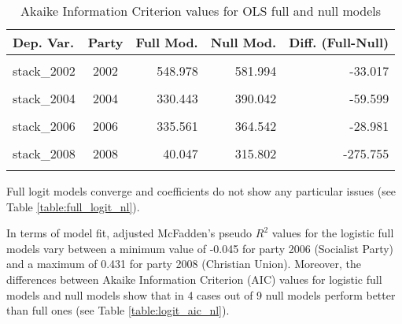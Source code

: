 \documentclass[
]{article}
\begin{document}
\begin{table}[!h]

\caption{\label{tab:unnamed-chunk-131}Akaike Information Criterion values for OLS full and null models 
        \label{table:ols_aic_nl}}
\centering
\begin{tabular}[t]{lcrrr}
\toprule
Dep. Var. & Party & Full Mod. & Null Mod. & Diff. (Full-Null)\\
\midrule
\cellcolor{gray!6}{stack\_2001} & \cellcolor{gray!6}{2001} & \cellcolor{gray!6}{454.279} & \cellcolor{gray!6}{531.738} & \cellcolor{gray!6}{-77.459}\\
stack\_2002 & 2002 & 548.978 & 581.994 & -33.017\\
\cellcolor{gray!6}{stack\_2003} & \cellcolor{gray!6}{2003} & \cellcolor{gray!6}{217.757} & \cellcolor{gray!6}{350.169} & \cellcolor{gray!6}{-132.411}\\
stack\_2004 & 2004 & 330.443 & 390.042 & -59.599\\
\cellcolor{gray!6}{stack\_2005} & \cellcolor{gray!6}{2005} & \cellcolor{gray!6}{473.891} & \cellcolor{gray!6}{525.482} & \cellcolor{gray!6}{-51.591}\\
\addlinespace
stack\_2006 & 2006 & 335.561 & 364.542 & -28.981\\
\cellcolor{gray!6}{stack\_2007} & \cellcolor{gray!6}{2007} & \cellcolor{gray!6}{429.023} & \cellcolor{gray!6}{448.610} & \cellcolor{gray!6}{-19.586}\\
stack\_2008 & 2008 & 40.047 & 315.802 & -275.755\\
\cellcolor{gray!6}{stack\_2012} & \cellcolor{gray!6}{2012} & \cellcolor{gray!6}{625.283} & \cellcolor{gray!6}{658.327} & \cellcolor{gray!6}{-33.044}\\
\bottomrule
\end{tabular}
\end{table}

Full logit models converge and coefficients do not show any particular issues (see Table
\ref{table:full_logit_nl}).

In terms of model fit, adjusted McFadden's pseudo \(R^2\) values for the logistic full models vary between
a minimum value of
-0.045
for party 2006
(Socialist Party)
and a maximum of
0.431
for party 2008
(Christian Union).
Moreover, the differences between Akaike Information Criterion (AIC) values for logistic full models and null models show that in 4 cases out of 9 null models perform better than full ones (see Table
\ref{table:logit_aic_nl}).
\end{document}
